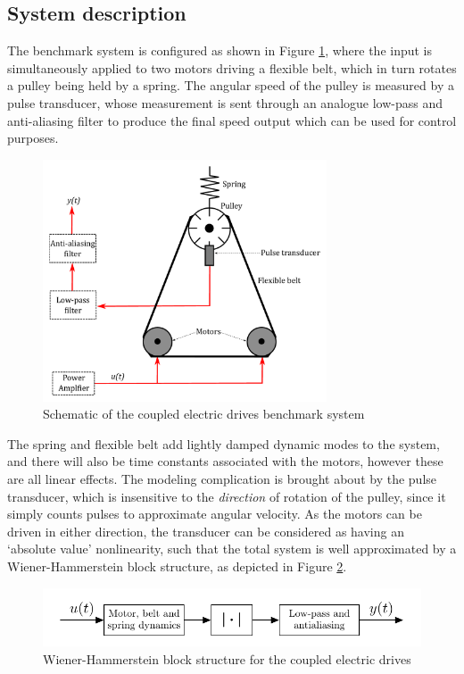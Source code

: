 \subsection{System description}
\label{sec:CED_description}

The benchmark system is configured as shown in Figure \ref{fig:CoupledDrivesSchematic}, where the input is simultaneously applied to two motors driving a flexible belt, which in turn rotates a pulley being held by a spring. The angular speed of the pulley is measured by a pulse transducer, whose measurement is sent through an analogue low-pass and anti-aliasing filter to produce the final speed output which can be used for control purposes.  

\begin{figure}[h]
\centering
\includegraphics[width=0.75\textwidth]{Chapter6_CaseStudies/DrivesSchematic.pdf}
\caption{Schematic of the coupled electric drives benchmark system} \label{fig:CoupledDrivesSchematic}
\end{figure}

The spring and flexible belt add lightly damped dynamic modes to the system, and there will also be time constants associated with the motors, however these are all linear effects. The modeling complication is brought about by the pulse transducer, which is insensitive to the \emph{direction} of rotation of the pulley, since it simply counts pulses to approximate angular velocity. As the motors can be driven in either direction, the transducer can be considered as having an `absolute value' nonlinearity, such that the total system is well approximated by a Wiener-Hammerstein block structure, as depicted in Figure \ref{fig:WienerHamm_CED}. 

\begin{figure}[h]
\centering
\includegraphics[scale = 1]{Chapter6_CaseStudies/WienerHammCED.pdf}
\caption{Wiener-Hammerstein block structure for the coupled electric drives} \label{fig:WienerHamm_CED}
\end{figure}

